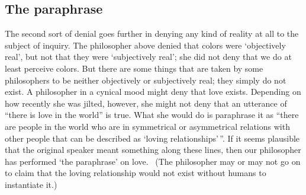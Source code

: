 \documentclass[11pt]{article}
\begin{document}
\begin{spacing}{1.5}
\section{The paraphrase}
\label{paraphrase}
The second sort of denial goes further in denying any kind of reality at all to the subject of inquiry. The philosopher above denied that colors were `objectively real', but not that they were `subjectively real'; she did not deny that we do at least perceive colors. But there are some things that are taken by some philosophers to be neither objectively or subjectively real; they simply do not exist. A philosopher in a cynical mood might deny that love exists. Depending on how recently she was jilted, however, she might not deny that an utterance of ``there is love in the world'' is true. What she would do is paraphrase it as ``there are people in the world who are in symmetrical or asymmetrical relations with other people that can be described as `loving relationships'\,''. If it seems plausible that the original speaker meant something along these lines, then our philosopher has performed `the paraphrase' on love.%
\ (The philosopher may or may not go on to claim that the loving relationship would not exist without humans to instantiate it.)


\end{spacing}
\end{document}
